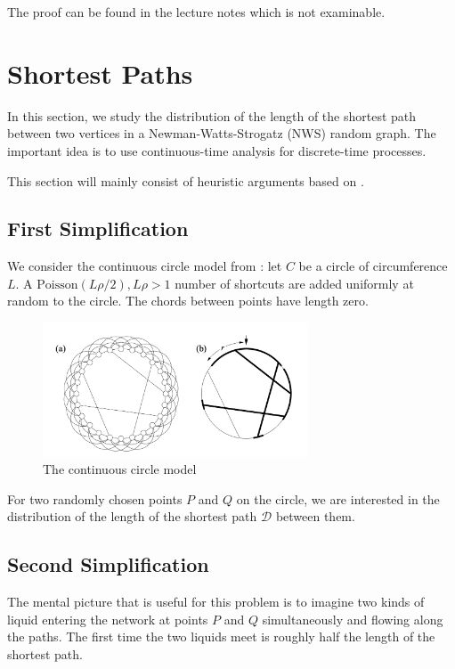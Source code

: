 \documentclass{article}
\begin{document}
The proof can be found in the lecture notes which is not examinable.

\section{Shortest Paths}
In this section, we study the distribution of the length of the shortest path between two vertices in a Newman-Watts-Strogatz (NWS) random graph. The important idea is to use continuous-time analysis for discrete-time processes. 

This section will mainly consist of heuristic arguments based on \citep{Reinert2001}.

\subsection{First Simplification}

We consider the continuous circle model from \citep{Newman_2000}: let $C$ be a circle of circumference $L$. A $\mathrm{Poisson}(L\rho/2), L\rho>1$ number of shortcuts are added uniformly at random to the circle. The chords between points have length zero. 

\begin{figure}[h]
    \centering
    \includegraphics[width=0.7\textwidth]{figures/newman1999.png}
    \caption{The continuous circle model \citep{Newman_2000}}
    \label{fig:newman1999}
\end{figure}

For two randomly chosen points $P$ and $Q$ on the circle, we are interested in the distribution of the length of the shortest path $\mathcal{D}$ between them.  

\subsection{Second Simplification}
The mental picture that is useful for this problem is to imagine two kinds of liquid entering the network at points $P$ and $Q$ simultaneously and flowing along the paths. The first time the two liquids meet is roughly half the length of the shortest path.  
\end{document}
